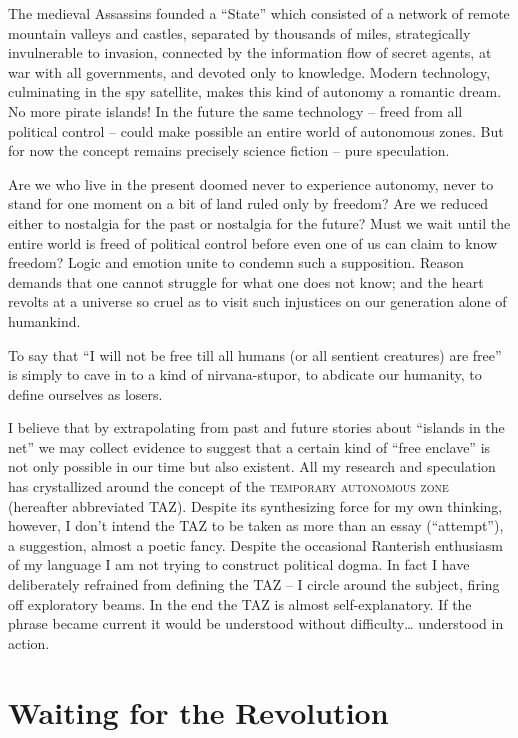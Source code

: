 \documentclass[a4paper,english,10pt,twoside]{article}
\begin{document}
\medskip
The medieval Assassins founded a \enquote{State} which consisted of a network of remote mountain valleys and castles, separated by thousands of miles, strategically invulnerable to invasion, connected by the information flow of secret agents, at war with all governments, and devoted only to knowledge. Modern technology, culminating in the spy satellite, makes this kind of autonomy a romantic dream. No more pirate islands! In the future the same technology --  freed from all political control -- could make possible an entire world of autonomous zones. But for now the concept remains precisely science fiction -- pure speculation.

\medskip
Are we who live in the present doomed never to experience autonomy, never to stand for one moment on a bit of land ruled only by freedom? Are we reduced either to nostalgia for the past or nostalgia for the future? Must we wait until the entire world is freed of political control before even one of us can claim to know freedom? Logic and emotion unite to condemn such a supposition. Reason demands that one cannot struggle for what one does not know; and the heart revolts at a universe so cruel as to visit such injustices on our generation alone of humankind.

\medskip
To say that \enquote{I will not be free till all humans (or all sentient creatures) are free} is simply to cave in to a kind of nirvana-stupor, to abdicate our humanity, to define ourselves as losers.

\medskip
I believe that by extrapolating from past and future stories about \enquote{islands in the net} we may collect evidence to suggest that a certain kind of \enquote{free enclave} is not only possible in our time but also existent. All my research and speculation has crystallized around the concept of the \textsc{temporary autonomous zone} (hereafter abbreviated TAZ). Despite its synthesizing force for my own thinking, however, I don't intend the TAZ to be taken as more than an essay (\enquote{attempt}), a suggestion, almost a poetic fancy. Despite the occasional Ranterish enthusiasm of my language I am not trying to construct political dogma. In fact I have deliberately refrained from defining the TAZ -- I circle around the subject, firing off exploratory beams. In the end the TAZ is almost self-explanatory. If the phrase became current it would be understood without difficulty… understood in action.

\section{Waiting for the Revolution}
\end{document}
